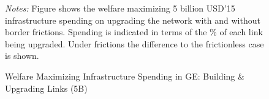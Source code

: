 \documentclass[a4paper]{article}
\begin{document}
\begin{figure}[h!] \vspace{-2mm}
\centering
\caption{\label{fig:GE_UG_5b} Welfare Maximizing Infrastructure Spending in GE: Building \& Upgrading Links (5B)}
\vspace{2mm}
\scriptsize 
\emph{Notes:} Figure shows the welfare maximizing 5 billion USD'15 infrastructure spending on upgrading the network with and without border frictions. Spending is indicated in terms of the \% of each link being upgraded. Under frictions the difference to the frictionless case is shown.   
\end{figure}
\end{document}
